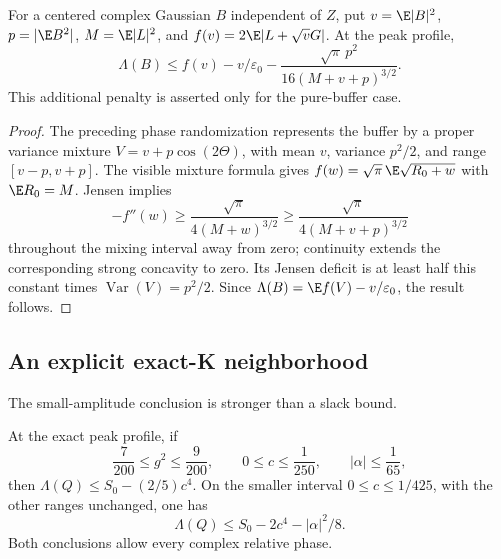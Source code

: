 \begin{proposition}
For a centered complex Gaussian $B$ independent of $Z$, put
$v=\E|B|^2$, $p=|\E B^2|$, $M=\E|L|^2$, and
$f(v)=2\E|L+\sqrt vG|$. At the peak profile,
\[
 \Lambda(B)\le f(v)-v/\varepsilon_0
       -\frac{\sqrt\pi\,p^2}{16(M+v+p)^{3/2}}.
\]
This additional penalty is asserted only for the pure-buffer case.
\end{proposition}
\begin{proof}
The preceding phase randomization represents the buffer by a proper
variance mixture $V=v+p\cos(2\Theta)$, with mean $v$, variance $p^2/2$,
and range $[v-p,v+p]$. The visible mixture formula gives
$f(w)=\sqrt\pi\,\E\sqrt{R_0+w}$ with $\E R_0=M$. Jensen implies
\[
 -f''(w)\ge\frac{\sqrt\pi}{4(M+w)^{3/2}}
          \ge\frac{\sqrt\pi}{4(M+v+p)^{3/2}}
\]
throughout the mixing interval away from zero; continuity extends
the corresponding strong concavity to zero. Its Jensen deficit is
at least half this constant times $\operatorname{Var}(V)=p^2/2$.
Since $\Lambda(B)=\E f(V)-v/\varepsilon_0$, the result follows.
\end{proof}

\subsection{An explicit exact-K neighborhood}
\label{sec:coherent-local}
The small-amplitude conclusion is stronger than a slack bound.
\begin{theorem}
\label{thm:coherent-local}
At the exact peak profile, if
\[
 \frac7{200}\le g^2\le\frac9{200},\qquad
 0\le c\le\frac1{250},\qquad |\alpha|\le\frac1{65},
\]
then $\Lambda(Q)\le S_0-(2/5)c^4$.
On the smaller interval $0\le c\le1/425$, with the other ranges
unchanged, one has
\[
 \boxed{\Lambda(Q)\le S_0-2c^4-|\alpha|^2/8.}
\]
Both conclusions allow every complex relative phase.
\end{theorem}

